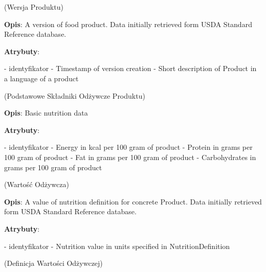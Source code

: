 \begin{enumerate}[label={\textbf{KAT/\protect\threedigits{\theenumi}}}, wide, labelwidth=!, labelindent=0pt, labelsep=0pt, series=reqs]
     \label{kat:ProductVersion} (Wersja Produktu)

    \textbf{Opis}: A version of food product. Data initially retrieved form USDA Standard Reference database.
    \par
    \textbf{Atrybuty}:
    \begin{itemize}[series=atr, wide, align=left, leftmargin=190pt]
         \label{kat:ProductVersion:id} - identyfikator
         \label{kat:ProductVersion:createdDate} - Timestamp of version creation
         \label{kat:ProductVersion:description} - Short description of Product in a language of a product
    \end{itemize}

     \label{kat:ProductBasicNutritionData} (Podstawowe Składniki Odżywcze Produktu)

    \textbf{Opis}: Basic nutrition data
    \par
    \textbf{Atrybuty}:
    \begin{itemize}[series=atr, wide, align=left, leftmargin=190pt]
         \label{kat:ProductBasicNutritionData:id} - identyfikator
         \label{kat:ProductBasicNutritionData:energy} - Energy in kcal per 100 gram of product
         \label{kat:ProductBasicNutritionData:protein} - Protein in grams per 100 gram of product
         \label{kat:ProductBasicNutritionData:fat} - Fat in grams per 100 gram of product
         \label{kat:ProductBasicNutritionData:carbohydrates} - Carbohydrates in grams per 100 gram of product
    \end{itemize}

     \label{kat:NutritionData} (Wartość Odżywcza)

    \textbf{Opis}: A value of nutrition definition for concrete Product. Data initially retrieved form USDA Standard Reference database.
    \par
    \textbf{Atrybuty}:
    \begin{itemize}[series=atr, wide, align=left, leftmargin=190pt]
         \label{kat:NutritionData:id} - identyfikator
         \label{kat:NutritionData:nutritionValue} - Nutrition value in units specified in NutritionDefinition
    \end{itemize}

     \label{kat:NutritionDefinition} (Definicja Wartości Odżywczej)


\end{enumerate}
